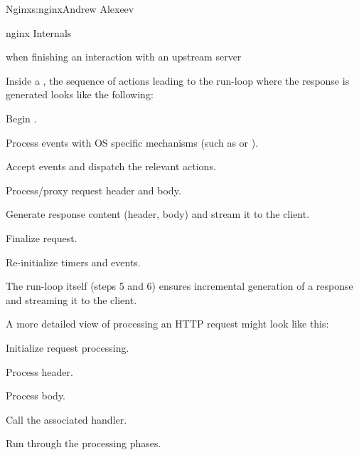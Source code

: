 \begin{aosachapter}{Nginx}{s:nginx}{Andrew Alexeev}
\begin{aosasect1}{nginx Internals}
\begin{aosaitemize}
\item when finishing an interaction with an upstream server

\end{aosaitemize}

Inside a , the sequence of actions leading to the
run-loop where the response is generated looks like the following:

\begin{aosaenumerate}

\item Begin .

\item Process events with OS specific mechanisms (such as 
  or ).

\item Accept events and dispatch the relevant actions.

\item Process/proxy request header and body.

\item Generate response content (header, body) and stream it to the
  client.

\item Finalize request.

\item Re-initialize timers and events.

\end{aosaenumerate}

The run-loop itself (steps 5 and 6) ensures incremental generation of
a response and streaming it to the client.


A more detailed view of processing an HTTP request might look like
this:

\begin{aosaenumerate}

\item Initialize request processing.

\item Process header.

\item Process body.

\item Call the associated handler.

\item Run through the processing phases.

\end{aosaenumerate}


\end{aosasect1}
\end{aosachapter}
